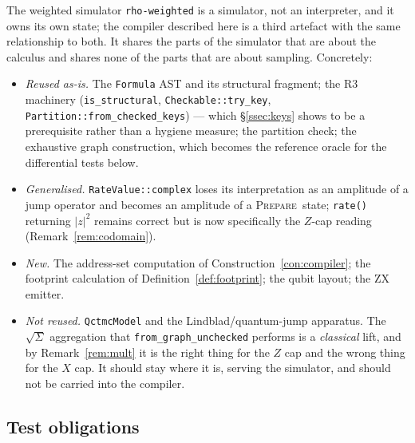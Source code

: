 \documentclass[11pt]{article}
\theoremstyle{definition}
\theoremstyle{plain}
\newcommand{\PREP}{\textsc{Prepare}}
\begin{document}
The weighted simulator \texttt{rho-weighted} is a simulator, not an interpreter, and it owns its
own state; the compiler described here is a third artefact with the same relationship to both. It
shares the parts of the simulator that are about the calculus and shares none of the parts that
are about sampling. Concretely:

\begin{itemize}[leftmargin=*]
  \item \emph{Reused as-is.} The \texttt{Formula} AST and its structural fragment; the R3
        machinery (\texttt{is\_structural}, \texttt{Checkable::try\_key},
        \texttt{Partition::from\_checked\_keys}) --- which \S\ref{ssec:keys} shows to be a
        prerequisite rather than a hygiene measure; the partition check; the exhaustive graph
        construction, which becomes the reference oracle for the differential tests below.
  \item \emph{Generalised.} \texttt{RateValue::complex} loses its interpretation as an amplitude
        of a jump operator and becomes an amplitude of a \PREP\ state; \texttt{rate()} returning
        $|z|^2$ remains correct but is now specifically the $Z$-cap reading
        (Remark~\ref{rem:codomain}).
  \item \emph{New.} The address-set computation of Construction~\ref{con:compiler}; the footprint
        calculation of Definition~\ref{def:footprint}; the qubit layout; the ZX emitter.
  \item \emph{Not reused.} \texttt{QctmcModel} and the Lindblad/quantum-jump apparatus. The
        $\sqrt{\Sigma}$ aggregation that \texttt{from\_graph\_unchecked} performs is a
        \emph{classical} lift, and by Remark~\ref{rem:mult} it is the right thing for the $Z$ cap
        and the wrong thing for the $X$ cap. It should stay where it is, serving the simulator,
        and should not be carried into the compiler.
\end{itemize}

\subsection{Test obligations}
\end{document}
